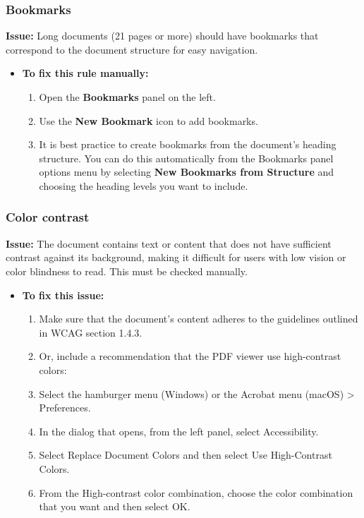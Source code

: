 \subsubsection{Bookmarks}
\label{ssubsec:pdf-bookmarks}

\textbf{Issue:} Long documents (21 pages or more) should have bookmarks that correspond to the document structure for easy navigation.

\begin{itemize}
	\item \textbf{To fix this rule manually:}
	      \begin{enumerate}
		      \item Open the \textbf{Bookmarks} panel on the left.
		      \item Use the \textbf{New Bookmark} icon to add bookmarks.
		      \item It is best practice to create bookmarks from the document's heading structure. You can do this automatically from the Bookmarks panel options menu by selecting \textbf{New Bookmarks from Structure} and choosing the heading levels you want to include.
	      \end{enumerate}
\end{itemize}

\subsubsection{Color contrast}
\label{ssubsec:pdf-color-contrast}

\textbf{Issue:} The document contains text or content that does not have sufficient contrast against its background, making it difficult for users with low vision or color blindness to read. This must be checked manually.

\begin{itemize}
	\item \textbf{To fix this issue:}
	      \begin{enumerate}
		      \item Make sure that the document's content adheres to the guidelines outlined in WCAG section 1.4.3.
		      \item Or, include a recommendation that the PDF viewer use high-contrast colors:
		      \item Select the hamburger menu (Windows) or the Acrobat menu (macOS) > Preferences.
		      \item In the dialog that opens, from the left panel, select Accessibility.
		      \item Select Replace Document Colors and then select Use High-Contrast Colors.
		      \item From the High-contrast color combination, choose the color combination that you want and then select OK.
	      \end{enumerate}
\end{itemize}

